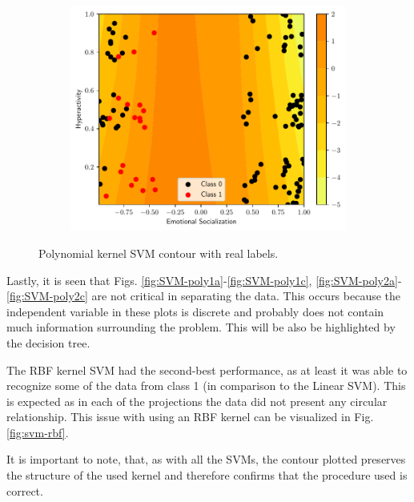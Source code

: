 \begin{figure}
\begin{subfigure}[b]{0.32\textwidth}
    \centering \includegraphics[width=\textwidth]{figs/svm-poly-contour-2-5.pdf}
    \caption{}
    \label{fig:SVM-poly3c}
  \end{subfigure}
  \caption{Polynomial kernel SVM contour with real labels.}
  \label{fig:SVM-poly}
\end{figure}

Lastly, it is seen that Figs. \ref{fig:SVM-poly1a}-\ref{fig:SVM-poly1c},
\ref{fig:SVM-poly2a}-\ref{fig:SVM-poly2c} are not critical in separating the
data. This occurs because the independent variable in these plots is discrete
and probably does not contain much information surrounding the problem. This
will be also be highlighted by the decision tree.

The RBF kernel SVM had the second-best performance, as at least it was able to
recognize some of the data from class 1 (in comparison to the Linear SVM). This
is expected as in each of the projections the data did not present any circular
relationship. This issue with using an RBF kernel can be visualized in Fig.
\ref{fig:svm-rbf}.

It is important to note, that, as with all the SVMs, the contour plotted
preserves the structure of the used kernel and therefore confirms that the
procedure used is correct.

